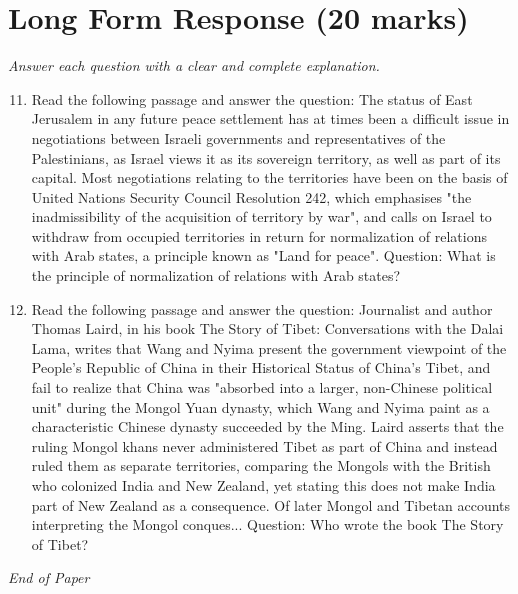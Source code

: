 \documentclass[12pt]{article}
\begin{document}
\section*{Long Form Response (20 marks)}
\textit{Answer each question with a clear and complete explanation.}
\begin{enumerate}[label=\arabic*.]
\setcounter{enumi}{10}
\item Read the following passage and answer the question: The status of East Jerusalem in any future peace settlement has at times been a difficult issue in negotiations between Israeli governments and representatives of the Palestinians, as Israel views it as its sovereign territory, as well as part of its capital. Most negotiations relating to the territories have been on the basis of United Nations Security Council Resolution 242, which emphasises "the inadmissibility of the acquisition of territory by war", and calls on Israel to withdraw from occupied territories in return for normalization of relations with Arab states, a principle known as "Land for peace". Question: What is the principle of normalization of relations with Arab states?
\item Read the following passage and answer the question: Journalist and author Thomas Laird, in his book The Story of Tibet: Conversations with the Dalai Lama, writes that Wang and Nyima present the government viewpoint of the People's Republic of China in their Historical Status of China's Tibet, and fail to realize that China was "absorbed into a larger, non-Chinese political unit" during the Mongol Yuan dynasty, which Wang and Nyima paint as a characteristic Chinese dynasty succeeded by the Ming. Laird asserts that the ruling Mongol khans never administered Tibet as part of China and instead ruled them as separate territories, comparing the Mongols with the British who colonized India and New Zealand, yet stating this does not make India part of New Zealand as a consequence. Of later Mongol and Tibetan accounts interpreting the Mongol conques... Question: Who wrote the book The Story of Tibet?
\end{enumerate}

\vfill
\noindent\textit{End of Paper}
\end{document}
